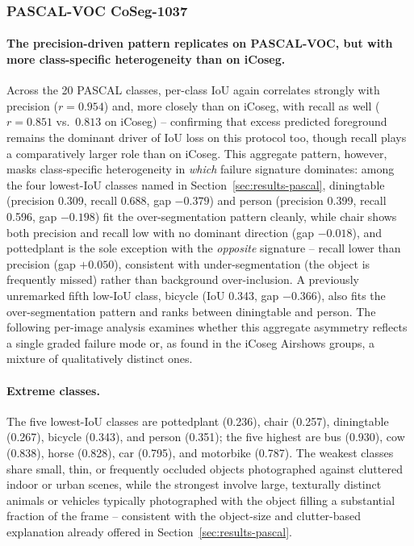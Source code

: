\subsubsection{PASCAL-VOC CoSeg-1037}
\label{sec:per-class-pascal}

\paragraph{The precision-driven pattern replicates on PASCAL-VOC, but with more class-specific heterogeneity than on iCoseg.} Across the 20 PASCAL classes, per-class IoU again correlates strongly with precision ($r=0.954$) and, more closely than on iCoseg, with recall as well ($r=0.851$ vs.\ $0.813$ on iCoseg) -- confirming that excess predicted foreground remains the dominant driver of IoU loss on this protocol too, though recall plays a comparatively larger role than on iCoseg. This aggregate pattern, however, masks class-specific heterogeneity in \emph{which} failure signature dominates: among the four lowest-IoU classes named in Section~\ref{sec:results-pascal}, diningtable (precision 0.309, recall 0.688, gap $-0.379$) and person (precision 0.399, recall 0.596, gap $-0.198$) fit the over-segmentation pattern cleanly, while chair shows both precision and recall low with no dominant direction (gap $-0.018$), and pottedplant is the sole exception with the \emph{opposite} signature -- recall lower than precision (gap $+0.050$), consistent with under-segmentation (the object is frequently missed) rather than background over-inclusion. A previously unremarked fifth low-IoU class, bicycle (IoU 0.343, gap $-0.366$), also fits the over-segmentation pattern and ranks between diningtable and person. The following per-image analysis examines whether this aggregate asymmetry reflects a single graded failure mode or, as found in the iCoseg Airshows groups, a mixture of qualitatively distinct ones.

\paragraph{Extreme classes.} The five lowest-IoU classes are pottedplant (0.236), chair (0.257), diningtable (0.267), bicycle (0.343), and person (0.351); the five highest are bus (0.930), cow (0.838), horse (0.828), car (0.795), and motorbike (0.787). The weakest classes share small, thin, or frequently occluded objects photographed against cluttered indoor or urban scenes, while the strongest involve large, texturally distinct animals or vehicles typically photographed with the object filling a substantial fraction of the frame -- consistent with the object-size and clutter-based explanation already offered in Section~\ref{sec:results-pascal}.

